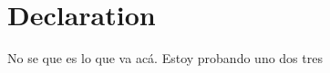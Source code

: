 \chapter*{Declaration}
\thispagestyle{empty}

No se que es lo que va acá.
Estoy probando
uno dos tres

